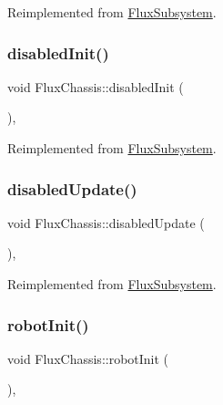 Reimplemented from \hyperlink{classFluxSubsystem_aceed900af22503022b8d1278f3693f77}{Flux\+Subsystem}.

\mbox{\label{classFluxChassis_a12226856b3b697fe9b5649950083d289}} 
\subsubsection{\texorpdfstring{disabled\+Init()}{disabledInit()}}
{\footnotesize\ttfamily void Flux\+Chassis\+::disabled\+Init (\begin{DoxyParamCaption}{ }\end{DoxyParamCaption})\hspace{0.3cm}{\ttfamily [override]}, {\ttfamily [virtual]}}



Reimplemented from \hyperlink{classFluxSubsystem_aa0b8fde8aa5094627d15d24e545e1da4}{Flux\+Subsystem}.

\mbox{\label{classFluxChassis_a1d3d201e0761cd75a3eb5bab58ea1fb2}} 
\subsubsection{\texorpdfstring{disabled\+Update()}{disabledUpdate()}}
{\footnotesize\ttfamily void Flux\+Chassis\+::disabled\+Update (\begin{DoxyParamCaption}{ }\end{DoxyParamCaption})\hspace{0.3cm}{\ttfamily [override]}, {\ttfamily [virtual]}}



Reimplemented from \hyperlink{classFluxSubsystem_a5c39cb0f0834cc77a2b8f4f47778da87}{Flux\+Subsystem}.

\mbox{\label{classFluxChassis_a32d9d7767f8ce15fdd10f8116145e408}} 
\subsubsection{\texorpdfstring{robot\+Init()}{robotInit()}}
{\footnotesize\ttfamily void Flux\+Chassis\+::robot\+Init (\begin{DoxyParamCaption}{ }\end{DoxyParamCaption})\hspace{0.3cm}{\ttfamily [override]}, {\ttfamily [virtual]}}



